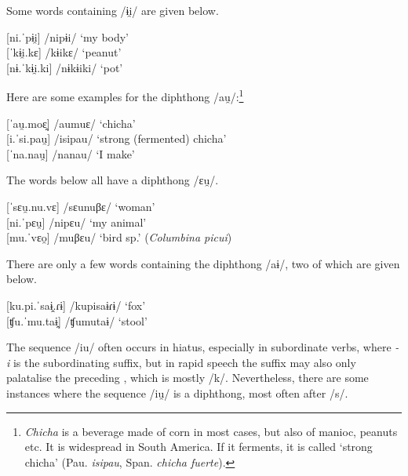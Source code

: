 	
Some words containing /ɨi̯/ are given below.	

\ea %
        {[}ni.ˈpɨi̯] \tab /nipɨi/ \tab ‘my body’\\
	{[}ˈkɨi̯.kɛ] \tab /kɨikɛ/ \tab ‘peanut’\\
        {[}nɨ.ˈkɨi̯.ki] \tab /nɨkɨiki/ \tab ‘pot’\\%
	\xe
	
	
Here are some examples for the diphthong /au̯/:\footnote{\textit{Chicha} is a beverage made of corn in most cases, but also of manioc, peanuts etc. It is widespread in South America. If it ferments, it is called ‘strong chicha’ (Pau. \textit{isipau}, Span. \textit{chicha fuerte}).}
	
\ea %
        {[}ˈau̯.moɛ̯] \tab /aumuɛ/ \tab ‘chicha’\\
	{[}i.ˈsi.pau̯] \tab /isipau/ \tab ‘strong (fermented) chicha’\\
	{[}ˈna.nau̯] \tab /nanau/ \tab ‘I make’\\%
	\xe

The words below all have a diphthong /ɛu̯/.

\ea %
        {[}ˈsɛu̯.nu.vɛ] \tab /sɛunuβɛ/ \tab ‘woman’\\
	{[}ni.ˈpɛu̯] \tab /nipɛu/ \tab ‘my animal’\\
	{[}mu.ˈvɛo̯] \tab /muβɛu/ \tab ‘bird sp.’ (\textit{Columbina picui}) \\%
	\xe
	
	
There are only a few words containing the diphthong /aɨ/, two of which are given below.

\ea %
        {[}ku.pi.ˈsaɨ̯.ɾɨ] \tab /kupisaɨɾɨ/ \tab ‘fox’\\
        {[}ʧu.ˈmu.taɨ̯] \tab\tab /ʧumutaɨ/ \tab ‘stool’\\%
	\xe
	

The sequence /iu/ often occurs in hiatus, especially in subordinate verbs, where \textit{-i} is the subordinating suffix, but in rapid speech the suffix may also only palatalise the preceding , which is mostly /k/. Nevertheless, there are some instances where the sequence /iu̯/ is a diphthong, most often after /s/.

